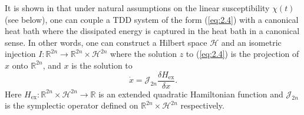 It is shown in \cite{Figotin:2006jy,Figotin:2005} that under natural assumptions on the linear susceptibility $\chi(t)$ (see below), one can couple a TDD system of the form (\ref{eq:2.4}) with a canonical heat bath where the dissipated energy is captured in the heat bath in a canonical sense. In other words, one can construct a Hilbert space $\mathcal H$ and an isometric injection $I:\mathbb R^{2n} \to \mathbb R^{2n}\times \mathcal H^{2n}$ where the solution $z$ to (\ref{eq:2.4}) is the projection of $x$ onto $\mathbb R^{2n}$, and $x$ is the solution to
\begin{equation} \label{eq:2.7}
	\dot x = \mathcal J_{2n} \frac{\delta H_{\text{ex}}}{\delta x}.
\end{equation}
Here $H_{\text{ex}}:\mathbb R^{2n}\times \mathcal H^{2n} \to \mathbb R$ is an extended quadratic Hamiltonian function and $\mathcal J_{2n}$ is the symplectic operator defined on $\mathbb R^{2n}\times \mathcal H^{2n}$ respectively.

